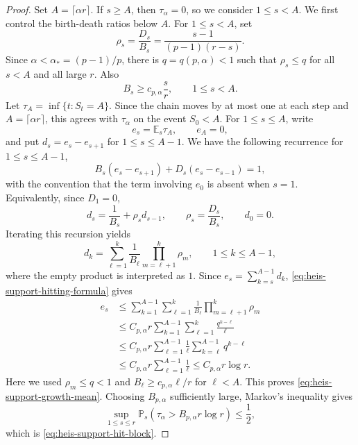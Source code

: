\documentclass[11pt, reqno]{amsart}
\numberwithin{equation}{section}
\newcommand{\Prob}{\mathbb P}
\newcommand{\E}{\mathbb E}
\begin{document}
\begin{proof}
Set \(A=\lceil\alpha r\rceil\).  If \(s\ge A\), then \(\tau_\alpha=0\), so
we consider \(1\le s<A\).  We first control the birth-death ratios below
\(A\).  For \(1\le s<A\), set
\begin{equation} \label{EqBDRatio}
    \rho_s=\frac{D_s}{B_s}=\frac{s-1}{(p-1)(r-s)}.
\end{equation}
Since \(\alpha<\alpha_*=(p-1)/p\), there is \(q=q(p,\alpha)<1\) such that
\(\rho_s\le q\) for all \(s<A\) and all large \(r\).  Also
\[
    B_s\ge c_{p,\alpha}\frac{s}{r},\qquad 1\le s<A.
\]
Let \(\tau_A=\inf\{t:S_t=A\}\).  Since the chain moves by at most one at
each step and \(A=\lceil \alpha r\rceil\), this agrees with \(\tau_\alpha\) on
the event \(S_0<A\).  For \(1\le s\le A\), write
\[
    e_s=\E_s\tau_A ,
    \qquad e_A=0,
\]
and put \(d_s=e_s-e_{s+1}\) for \(1\le s\le A-1\). We have the following recurrence for \(1\le s\le A-1\),
\begin{equation}\label{eq:heis-support-hitting-recursion}
    B_s(e_s-e_{s+1})+D_s(e_s-e_{s-1})=1,
\end{equation}
with the convention that the term involving \(e_0\) is absent when \(s=1\).
Equivalently, since \(D_1=0\),
\[
    d_s=\frac1{B_s}+\rho_s d_{s-1},
    \qquad
    \rho_s=\frac{D_s}{B_s},
    \qquad d_0=0.
\]
Iterating this recursion yields
\begin{equation}\label{eq:heis-support-hitting-formula}
    d_k
    =
    \sum_{\ell=1}^k
    \frac1{B_\ell}
    \prod_{m=\ell+1}^k \rho_m ,
    \qquad 1\le k\le A-1,
\end{equation}
where the empty product is interpreted as \(1\).  Since
\(e_s=\sum_{k=s}^{A-1}d_k\), \eqref{eq:heis-support-hitting-formula} gives
\[
\begin{aligned}
    e_s
    &\le
    \sum_{k=1}^{A-1}
    \sum_{\ell=1}^k
    \frac1{B_\ell}
    \prod_{m=\ell+1}^k \rho_m  \\
    &\le
    C_{p,\alpha} r
    \sum_{k=1}^{A-1}
    \sum_{\ell=1}^k
    \frac{q^{k-\ell}}{\ell}  \\
    &\le
    C_{p,\alpha} r
    \sum_{\ell=1}^{A-1}
    \frac1\ell
    \sum_{k=\ell}^{A-1} q^{k-\ell}  \\
    &\le
    C_{p,\alpha} r
    \sum_{\ell=1}^{A-1}\frac1\ell
    \le C_{p,\alpha}r\log r .
\end{aligned}
\]
Here we used \(\rho_m\le q<1\) and
\(B_\ell\ge c_{p,\alpha}\ell/r\) for \(\ell<A\).  This proves
\eqref{eq:heis-support-growth-mean}.  Choosing \(B_{p,\alpha}\) sufficiently
large, Markov's inequality gives
\[
    \sup_{1\le s\le r}
    \Prob_s(\tau_\alpha>B_{p,\alpha}r\log r)
    \le \frac12,
\]
which is \eqref{eq:heis-support-hit-block}.
\end{proof}
\end{document}
